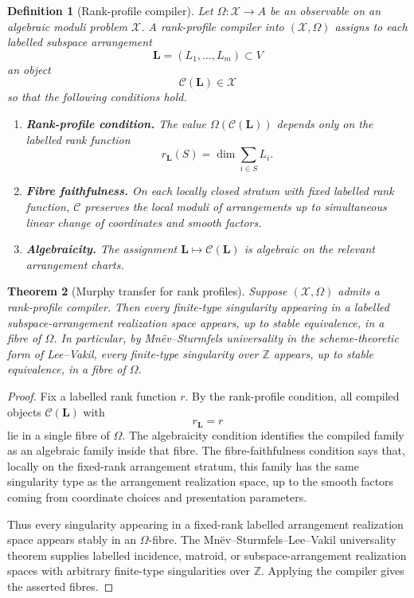 \documentclass[11pt]{article}
\newtheorem{theorem}{Theorem}[section]
\newtheorem{definition}[theorem]{Definition}
\begin{document}
\begin{definition}[Rank-profile compiler]
Let \(\Omega:\mathcal X\to A\) be an observable on an algebraic moduli problem \(\mathcal X\). A rank-profile compiler into \((\mathcal X,\Omega)\) assigns to each labelled subspace arrangement
\[
\mathbf L=(L_1,\ldots,L_m)\subset V
\]
an object
\[
\mathcal C(\mathbf L)\in\mathcal X
\]
so that the following conditions hold.

\begin{enumerate}[label=(\roman*)]
\item \textbf{Rank-profile condition.} The value \(\Omega(\mathcal C(\mathbf L))\) depends only on the labelled rank function
\[
r_{\mathbf L}(S)=\dim\sum_{i\in S}L_i.
\]
\item \textbf{Fibre faithfulness.} On each locally closed stratum with fixed labelled rank function, \(\mathcal C\) preserves the local moduli of arrangements up to simultaneous linear change of coordinates and smooth factors.
\item \textbf{Algebraicity.} The assignment \(\mathbf L\mapsto\mathcal C(\mathbf L)\) is algebraic on the relevant arrangement charts.
\end{enumerate}
\end{definition}

\begin{theorem}[Murphy transfer for rank profiles]
Suppose \((\mathcal X,\Omega)\) admits a rank-profile compiler. Then every finite-type singularity appearing in a labelled subspace-arrangement realization space appears, up to stable equivalence, in a fibre of \(\Omega\). In particular, by Mnëv--Sturmfels universality in the scheme-theoretic form of Lee--Vakil, every finite-type singularity over \(\mathbb Z\) appears, up to stable equivalence, in a fibre of \(\Omega\).
\end{theorem}

\begin{proof}
Fix a labelled rank function \(r\). By the rank-profile condition, all compiled objects \(\mathcal C(\mathbf L)\) with
\[
r_{\mathbf L}=r
\]
lie in a single fibre of \(\Omega\). The algebraicity condition identifies the compiled family as an algebraic family inside that fibre. The fibre-faithfulness condition says that, locally on the fixed-rank arrangement stratum, this family has the same singularity type as the arrangement realization space, up to the smooth factors coming from coordinate choices and presentation parameters.

Thus every singularity appearing in a fixed-rank labelled arrangement realization space appears stably in an \(\Omega\)-fibre. The Mnëv--Sturmfels--Lee--Vakil universality theorem supplies labelled incidence, matroid, or subspace-arrangement realization spaces with arbitrary finite-type singularities over \(\mathbb Z\). Applying the compiler gives the asserted fibres.
\end{proof}
\end{document}
